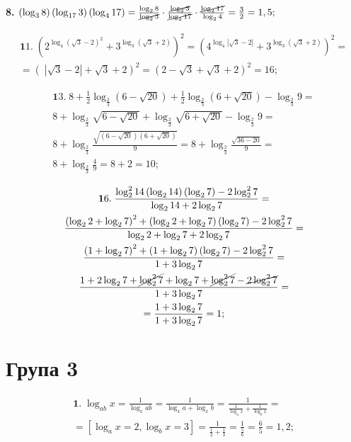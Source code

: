 \textbf{8.} $\left(\log_3 8\right)\left(\log_{17} 3\right)\left(\log_4 17\right) = \frac{\log_2 8}{\cancel{\log_2 3}} \cdot \frac{\cancel{\log_2 3}}{\cancel{\log_2 17}} \cdot \frac{\cancel{\log_2 17}}{\log_2 4} = \frac{3}{2} = 1,5;$

\begin{multline*}
{\mathbf 11.}\;
\left(2^{\log_4 \left(\sqrt{3} - 2\right)^2} + 3^{\log_3 \left(\sqrt{3} + 2\right)}\right)^2 =
\left(4^{\log_4 \left|\sqrt{3} - 2\right|} + 3^{\log_3 \left(\sqrt{3} + 2\right)}\right)^2 =\\
= \left(\;\left|\sqrt{3} - 2\right| + \sqrt{3} + 2\right)^2 =
\left(2 - \sqrt{3} + \sqrt{3} + 2\right)^2 = 16;
\end{multline*}

\begin{multline*}
{\mathbf 13.}\;
8 + \frac{1}{2}\log_{\frac{2}{3}} \left(6 - \sqrt{20}\right) + \frac{1}{2}\log_{\frac{2}{3}} \left(6 + \sqrt{20}\right) - \log_{\frac{2}{3}} 9 =\\
8 + \log_{\frac{2}{3}} \sqrt{6 - \sqrt{20}} + \log_{\frac{2}{3}} \sqrt{6 + \sqrt{20}} - \log_{\frac{2}{3}} 9 =\\
8 + \log_{\frac{2}{3}} \frac{\sqrt{\left(6 - \sqrt{20}\right)\left(6 + \sqrt{20}\right)}}{9} =
8 + \log_{\frac{2}{3}} \frac{\sqrt{36 - 20}}{9} =\\
8 + \log_{\frac{2}{3}} \frac{4}{9} = 8 + 2 = 10;
\end{multline*}

\begin{multline*}
{\mathbf 16.}\;
\frac{\log_2^2 14 \left(\log_2 14\right)\left(\log_2 7\right) - 2 \log_2^2 7}{\log_2 14 + 2\log_2 7} =\\
\frac{\left(\log_2 2 + \log_2 7\right)^2 + \left(\log_2 2 + \log_2 7\right)\left(\log_2 7\right) - 2\log_2^2 7}{\log_2 2 + \log_2 7 + 2\log_2 7} =\\
\frac{\left(1 + \log_2 7\right)^2 + \left(1 + \log_2 7\right)\left(\log_2 7\right) - 2\log_2^2 7}{1 + 3\log_2 7} =\\
\frac{1 + 2\log_2 7 + \cancel{\log_2^2 7} +\log_2 7 + \cancel{\log_2^2 7}- \cancel{2\log_2^2 7}}{1 + 3\log_2 7} =\\
= \frac{1 + 3\log_2 7}{1 + 3\log_2 7} = 1;
\end{multline*}
\section*{Група 3}

\begin{multline*}
{\mathbf 1.}\;
\log_{ab} x = \frac{1}{\log_x ab} = \frac{1}{\log_x a + \log_x b} = \frac{1}{\frac{1}{\log_a x} + \frac{1}{\log_b x}} =\\
= \left[\log_a x = 2, \log_b x = 3\right] = \frac{1}{\frac{1}{2} + \frac{1}{3}} = \frac{1}{\frac{5}{6}} = \frac{6}{5} = 1,2;
\end{multline*}

